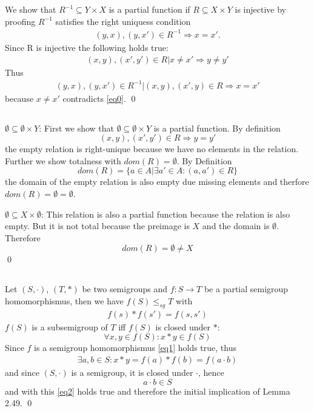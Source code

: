 \documentclass[a4paper,12pt,numbers=noenddot]{scrreport}
\begin{document}
\chapter{}
\section{}
We show that $R^{-1} \subseteq Y \times X$ is a partial function if $R \subseteq X \times Y$ is injective by proofing $R^{-1}$ satisfies the right uniquess condition
\begin{align*}
    (y,x), (y,x') \in R^{-1} \Rightarrow x = x'.
\end{align*}
Since R is injective the following holds true:
\begin{align*}
    (x,y), (x',y') \in R | x \neq x' \Rightarrow y \neq y'\label{eq0}\tag{1}
\end{align*}
Thus 
\begin{align*}
    (y,x), (y,x') \in R^{-1} | (x,y), (x', y) \in R  \Rightarrow x = x'
\end{align*}
because $x \neq x'$ contradicts \eqref{eq0}.
\qed

\section{}
$\emptyset \subseteq \emptyset \times Y$:
First we show that $\emptyset \subseteq \emptyset \times Y$ is a partial function.
By definition $$(x,y), (x',y') \in R \Rightarrow y = y'$$ the empty relation is right-unique because we have no elements in the relation.
Further we show totalness with $dom(R) = \emptyset$.
By Definition
$$dom(R) = \{a \in A | \exists a' \in A: (a,a') \in R\}$$
the domain of the empty relation is also empty due missing elements and therfore $dom(R) = \emptyset = \emptyset$.

\vspace{1cm}
$\emptyset \subseteq X \times \emptyset$: This relation is also a partial function because the relation is also empty.
But it is not total because the preimage is $X$ and the domain is $\emptyset$.
Therefore
$$dom(R) = \emptyset \neq X$$
\qed

\section{}
Let $(S, \cdot)$, $(T, *)$ be two semigroups and $f: S \rightarrow T$ be a partial semigroup homomorphismus, then we have $f(S) \leq_{sg} T$ with
\begin{align}
    f(s) * f(s') = f(s, s') \label{eq1}\tag{1}
\end{align}
$f(S)$ is a subsemigroup of $T$ iff $f(S)$ is closed under $*$:
$$\forall x,y \in f(S) : x * y \in f(S)$$
Since $f$ is a semigroup homomorphismus \eqref{eq1} holds true, thus
\begin{align}
    \exists a,b \in S : x * y = f(a) * f(b) = f(a \cdot b) \label{eq2}\tag{2}
\end{align}
and since $(S, \cdot)$ is a semigroup, it is closed under $\cdot$, hence
$$a \cdot b \in S$$
and with this \eqref{eq2} holds true and therefore the initial implication of Lemma 2.49.
\qed
\end{document}

